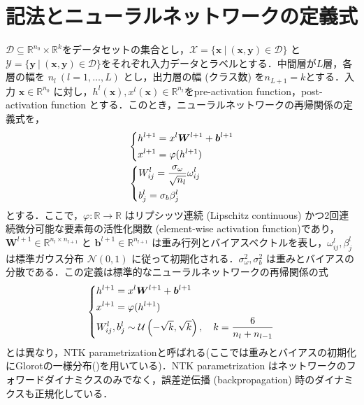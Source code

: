 \section{記法とニューラルネットワークの定義式}
\label{notation}
$\mathcal{D} \subseteq \mathbb{R}^{n_0} \times \mathbb{R}^{k}$をデータセットの集合とし，$\mathcal{X}=\{\bm{x} \ | \ (\bm{x},\bm{y}) \in \mathcal{D}\}$ と $\mathcal{Y}=\{\bm{y} \ | \ (\bm{x},\bm{y}) \in \mathcal{D}\}$をそれぞれ入力データとラベルとする．中間層が$L$層，各層の幅を $n_l  \ (l=1,\ldots,L)$ とし，出力層の幅 (クラス数) を$n_{L+1}=k$とする．入力 $\bm{x} \in \mathbb{R}^{n_0}$ に対し，$h^{l}(\bm{x}), x^{l}(\bm{x}) \in \mathbb{R}^{n_l}$をpre-activation function，post-activation function とする．このとき，ニューラルネットワークの再帰関係の定義式を，
\begin{align}
    &\begin{dcases}
        h^{l+1} = x^{l}\bm{W}^{l+1} + \bm{b}^{l+1} \\
        x^{l+1} = \varphi(h^{l+1})
    \end{dcases}
    \\
    &\begin{dcases}
        W_{ij}^{l} = \dfrac{\sigma_{\omega}}{\sqrt{n_l}}\omega_{ij}^{l} \\
        b_{j}^{l} = \sigma_b \beta_{j}^{l}
    \end{dcases}
\end{align}
とする．ここで，$\varphi:\mathbb{R} \rightarrow \mathbb{R}$ はリプシッツ連続 (Lipschitz continuous) かつ2回連続微分可能な要素毎の活性化関数 (element-wise activation function)であり，$\bm{W}^{l+1} \in \mathbb{R}^{n_{l} \times n_{l+1}}$ と $\bm{b}^{l+1} \in \mathbb{R}^{n_{l+1}}$ は重み行列とバイアスベクトルを表し，$\omega_{ij}^{l},\beta_{j}^{l}$ は標準ガウス分布 $\mathcal{N}(0, 1)$ に従って初期化される．$\sigma_{\omega}^2, \sigma_{b}^2$ は重みとバイアスの分散である．この定義は標準的なニューラルネットワークの再帰関係の式
\begin{align}
    \begin{dcases}
        h^{l+1} = x^{l}\bm{W}^{l+1} + \bm{b}^{l+1} \\
        x^{l+1} = \varphi(h^{l+1}) \\
        W_{ij}^{l}, b_{j}^{l} \sim \mathcal{U}\left(-\sqrt{k}, \sqrt{k}\right), \quad k = \dfrac{6}{n_l + n_{l-1}}
    \end{dcases}
\end{align}
とは異なり，NTK parametrizationと呼ばれる(ここでは重みとバイアスの初期化にGlorotの一様分布(\citealp{glorot2010understanding})を用いている)．NTK parametrization はネットワークのフォワードダイナミクスのみでなく，誤差逆伝播 (backpropagation) 時のダイナミクスも正規化している．

